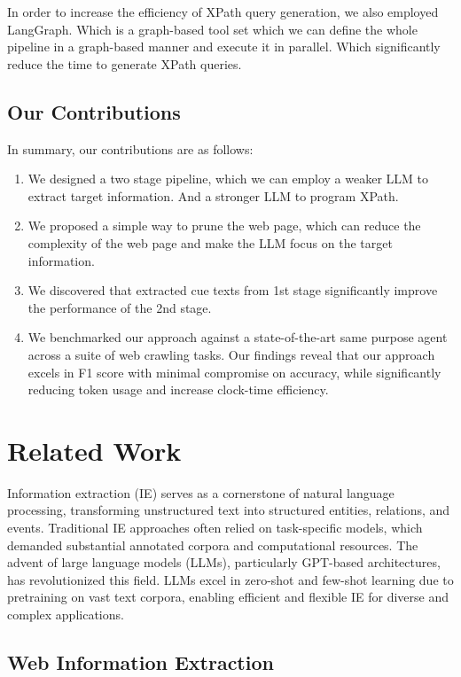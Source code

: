 \documentclass[a4paper]{article}
\begin{document}
In order to increase the efficiency of XPath query generation, we also employed LangGraph. Which is a graph-based tool set which we can define the whole pipeline in a graph-based manner and execute it in parallel. Which significantly reduce the time to generate XPath queries.

\subsection{Our Contributions}

In summary, our contributions are as follows:

\begin{enumerate}
  \item We designed a two stage pipeline, which we can employ a weaker LLM to extract target information. And a stronger LLM to program XPath.
  \item We proposed a simple way to prune the web page, which can reduce the complexity of the web page and make the LLM focus on the target information.
  \item We discovered that extracted cue texts from 1st stage significantly improve the performance of the 2nd stage.
  \item We benchmarked our approach against a state-of-the-art same purpose agent across a suite of web crawling tasks. Our findings reveal that our approach excels in F1 score with minimal compromise on accuracy, while significantly reducing token usage and increase clock-time efficiency.
\end{enumerate}
\section{Related Work}
Information extraction (IE) serves as a cornerstone of natural language processing, transforming unstructured text into structured entities, relations, and events. Traditional IE approaches often relied on task-specific models, which demanded substantial annotated corpora and computational resources. The advent of large language models (LLMs), particularly GPT-based architectures, has revolutionized this field. LLMs excel in zero-shot and few-shot learning due to pretraining on vast text corpora, enabling efficient and flexible IE for diverse and complex applications.

\subsection{Web Information Extraction}
\end{document}
